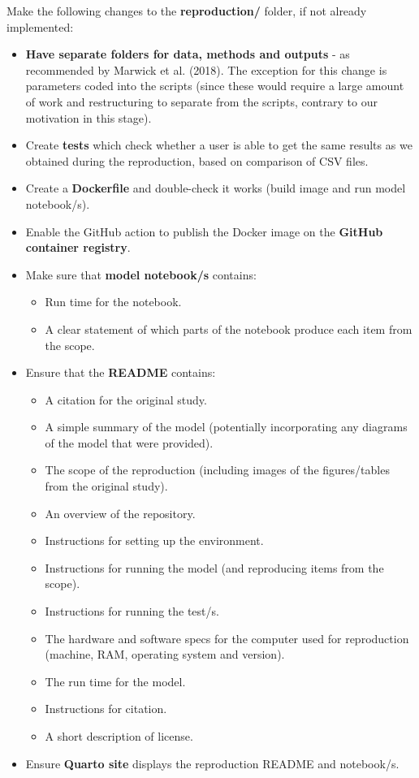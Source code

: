 Make the following changes to the \textbf{reproduction/} folder, if not already implemented:
\begin{itemize}
    \item \textbf{Have separate folders for data, methods and outputs} - as recommended by Marwick et al. (2018)\autocite{marwick_packaging_2018}. The exception for this change is parameters coded into the scripts (since these would require a large amount of work and restructuring to separate from the scripts, contrary to our motivation in this stage).
    \item Create \textbf{tests} which check whether a user is able to get the same results as we obtained during the reproduction, based on comparison of CSV files.
    \item Create a \textbf{Dockerfile} and double-check it works (build image and run model notebook/s).
    \item Enable the GitHub action to publish the Docker image on the \textbf{GitHub container registry}.
    \item Make sure that \textbf{model notebook/s} contains:
    \begin{itemize}
        \item Run time for the notebook.
        \item A clear statement of which parts of the notebook produce each item from the scope.
    \end{itemize}
    \item Ensure that the \textbf{README} contains:
    \begin{itemize}
        \item A citation for the original study.
        \item A simple summary of the model (potentially incorporating any diagrams of the model that were provided).
        \item The scope of the reproduction (including images of the figures/tables from the original study).
        \item An overview of the repository.
        \item Instructions for setting up the environment.
        \item Instructions for running the model (and reproducing items from the scope).
        \item Instructions for running the test/s.
        \item The hardware and software specs for the computer used for reproduction (machine, RAM, operating system and version).
        \item The run time for the model.
        \item Instructions for citation.
        \item A short description of license.
    \end{itemize}
    \item Ensure \textbf{Quarto site} displays the reproduction README and notebook/s.
\end{itemize}

